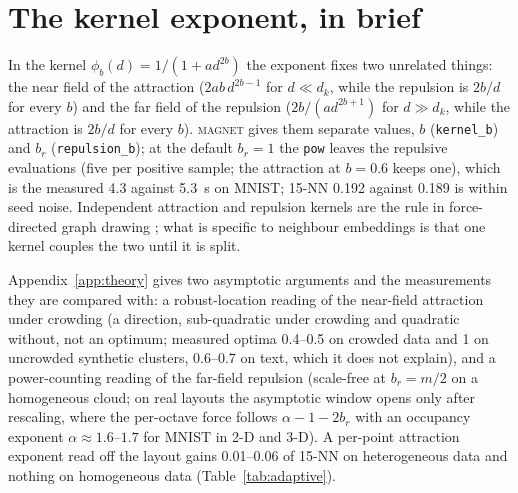 \documentclass[11pt]{article}
\newcommand{\magnet}{\textsc{magnet}}
\begin{document}
\begin{table}[t]
\centering\small
\caption{Graph inputs (\texttt{graph\_table.py}; 3 runs each, all cores; UMAP through
\texttt{simplicial\_set\_embedding} on the adjacency, 500 epochs below 10k nodes and 200 above).}
\label{tab:graphs}

\end{table}

\section{The kernel exponent, in brief}\label{sec:theory}
In the kernel $\phi_b(d) = 1/(1 + a d^{2b})$ the exponent fixes two unrelated things: the near field of
the attraction ($2ab\,d^{2b-1}$ for $d \ll d_k$, while the repulsion is $2b / d$ for every $b$) and the
far field of the repulsion ($2b / (a d^{2b+1})$ for $d \gg d_k$, while the attraction is $2b / d$ for
every $b$). \magnet{} gives them separate values, $b$ (\texttt{kernel\_b}) and $b_r$
(\texttt{repulsion\_b}); at the default $b_r = 1$ the \texttt{pow} leaves the repulsive evaluations
(five per positive sample; the attraction at $b = 0.6$ keeps one), which is the measured 4.3 against
5.3~s on MNIST; 15-NN 0.192 against 0.189 is within seed noise. Independent attraction and repulsion kernels are the rule in force-directed graph
drawing \citep{fruchterman1991, noack2007energy, jacomy2014forceatlas2}; what is specific to neighbour
embeddings is that one kernel couples the two until it is split.

Appendix~\ref{app:theory} gives two asymptotic arguments and the measurements they are compared with: a
robust-location reading of the near-field attraction under crowding (a direction, sub-quadratic under
crowding and quadratic without, not an optimum; measured optima 0.4--0.5 on crowded data and 1 on
uncrowded synthetic clusters, 0.6--0.7 on text, which it does not explain), and a power-counting reading
of the far-field repulsion (scale-free at $b_r = m/2$ on a homogeneous cloud; on real layouts the
asymptotic window opens only after rescaling, where the per-octave force follows $\alpha - 1 - 2b_r$
with an occupancy exponent $\alpha \approx 1.6$--$1.7$ for MNIST in 2-D and 3-D). A per-point attraction
exponent read off the layout gains 0.01--0.06 of 15-NN on heterogeneous data and nothing on homogeneous
data (Table~\ref{tab:adaptive}).
\end{document}

